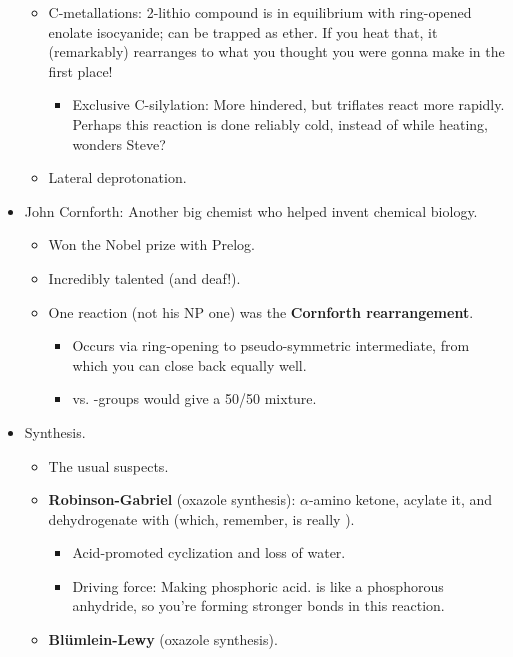 \documentclass[../notes.tex]{subfiles}
\begin{document}
\begin{itemize}
\begin{itemize}
        \item C-metallations: 2-lithio compound is in equilibrium with ring-opened enolate isocyanide; can be trapped as  ether. If you heat that, it (remarkably) rearranges to what you thought you were gonna make in the first place!
        \begin{itemize}
            \item Exclusive C-silylation: More hindered, but triflates react more rapidly. Perhaps this reaction is done reliably cold, instead of while heating, wonders Steve?
        \end{itemize}
        \item Lateral deprotonation.
    \end{itemize}
    \item John Cornforth: Another big chemist who helped invent chemical biology.
    \begin{itemize}
        \item Won the Nobel prize with Prelog.
        \item Incredibly talented (and deaf!).
        \item One reaction (not his NP one) was the \textbf{Cornforth rearrangement}.
        \begin{itemize}
            \item Occurs via ring-opening to pseudo-symmetric intermediate, from which you can close back equally well.
            \item {} vs.  -groups would give a 50/50 mixture.
        \end{itemize}
    \end{itemize}
    \item Synthesis.
    \begin{itemize}
        \item The usual suspects.
        \item \textbf{Robinson-Gabriel} (oxazole synthesis): $\alpha$-amino ketone, acylate it, and dehydrogenate with  (which, remember, is really ).
        \begin{itemize}
            \item Acid-promoted cyclization and loss of water.
            \item Driving force: Making phosphoric acid.  is like a phosphorous anhydride, so you're forming stronger  bonds in this reaction.
        \end{itemize}
        \item \textbf{Bl\"{u}mlein-Lewy} (oxazole synthesis).

\end{itemize}
\end{itemize}
\end{document}
